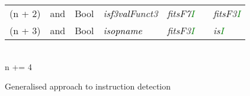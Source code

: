 \begin{algorithm}
{\begin{tabular}[h]{>{\ttfamily\color{UniRed}}r >{\ttfamily}l >{\ttfamily\color{UniGrey}}l >{\slshape\color{UniRed}}l >{\slshape\color{UniRed}}l >{\slshape\color{UniRed}}l >{\slshape} l}
            (n + 2) & and    & Bool & is\textcolor{Black}{f3val}Funct3 & fitsF7\textcolor{Green}{I} &  & fitsF3\textcolor{Green}{I} \\
            (n + 3) & and    & Bool & is\textcolor{Black}{opname}      & fitsF3\textcolor{Green}{I} &  & is\textcolor{Green}{I}     \\
            \hline
            \hline
        \end{tabular}\\
        \textcolor{UniRed}{n} += 4\\
    }
    \caption[Instruction detection]{Generalised approach to instruction detection}\label{alg:commanddetection}
\end{algorithm}